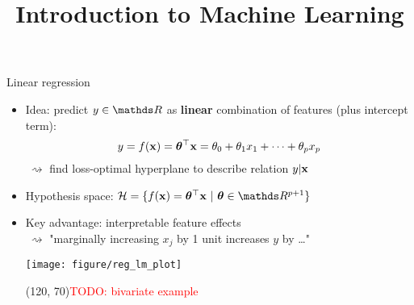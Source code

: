 \documentclass[11pt,compress,t,notes=noshow, xcolor=table]{beamer}
\title{Introduction to Machine Learning}
\institute{\href{https://compstat-lmu.github.io/lecture_i2ml/}{compstat-lmu.github.io/lecture\_i2ml}}
\date{}
\begin{document}

\begin{vbframe}{Linear regression}

\begin{itemize}
    \item Idea: predict $y \in \R$ as \textbf{linear} combination of features
    (plus intercept term):
    $$y = f(\mathbf{x}) = \bm{\theta}^\top \mathbf{x} = \theta_0 + \theta_1 x_1 + \dots + \theta_p x_p$$
    $~\rightsquigarrow$ find loss-optimal hyperplane to describe relation 
    $y | \mathbf{x}$
    \item Hypothesis space: $\Hspace = \{\fx = \thx\ |\ \thetab \in \R^{p+1} \}$
    \item Key advantage: interpretable feature effects \\ $~\rightsquigarrow$
    "marginally increasing $x_j$ by 1 unit increases $y$ by \dots"
    \vfill
    \begin{minipage}{0.45\textwidth}
        \texttt{[image: figure/reg\_lm\_plot]} 
    \end{minipage}
    \hfill
    \begin{minipage}{0.45\textwidth}
        \framebox(120, 70){\textcolor{red}{TODO: bivariate example}}
    \end{minipage}
\end{itemize}

\end{vbframe}

\end{document}
